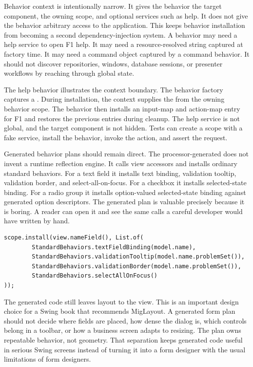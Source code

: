 Behavior context is intentionally narrow. It gives the behavior the target
component, the owning scope, and optional services such as help. It does not
give the behavior arbitrary access to the application. This keeps behavior
installation from becoming a second dependency-injection system. A behavior may
need a help service to open F1 help. It may need a resource-resolved string
captured at factory time. It may need a command object captured by a command
behavior. It should not discover repositories, windows, database sessions, or
presenter workflows by reaching through global state.

The help behavior illustrates the context boundary. The behavior factory
captures a . During installation, the context supplies the
 from the owning behavior scope. The behavior then installs an
input-map and action-map entry for F1 and restores the previous entries during
cleanup. The help service is not global, and the target component is not hidden.
Tests can create a scope with a fake service, install the behavior, invoke the
action, and assert the request.

Generated behavior plans should remain direct. The processor-generated
 does not invent a runtime reflection engine. It
calls view accessors and installs ordinary standard behaviors. For a text field
it installs text binding, validation tooltip, validation border, and
select-all-on-focus. For a checkbox it installs selected-state binding. For a
radio group it installs option-valued selected-state binding against generated
option descriptors. The generated plan is valuable precisely because it is
boring. A reader can open it and see the same calls a careful developer would
have written by hand.

\begin{lstlisting}[caption={The shape of a generated text-field plan.}]
scope.install(view.nameField(), List.of(
        StandardBehaviors.textFieldBinding(model.name),
        StandardBehaviors.validationTooltip(model.name.problemSet()),
        StandardBehaviors.validationBorder(model.name.problemSet()),
        StandardBehaviors.selectAllOnFocus()
));
\end{lstlisting}

The generated code still leaves layout to the view. This is an important design
choice for a Swing book that recommends MigLayout. A generated form plan should
not decide where fields are placed, how dense the dialog is, which controls
belong in a toolbar, or how a business screen adapts to resizing. The plan owns
repeatable behavior, not geometry. That separation keeps generated code useful
in serious Swing screens instead of turning it into a form designer with the
usual limitations of form designers.

